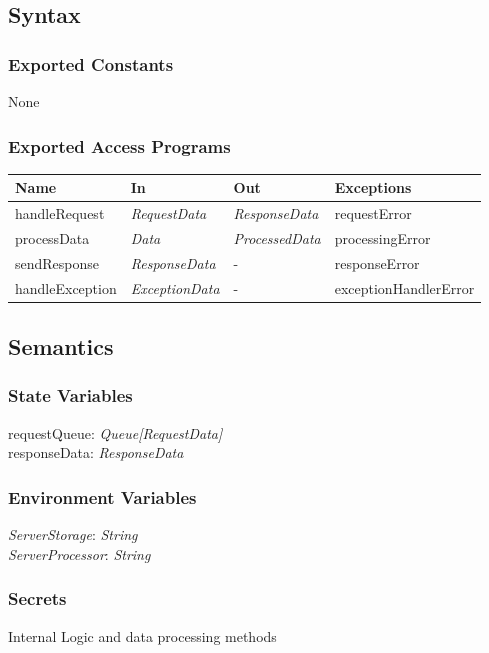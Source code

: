 \documentclass[12pt, titlepage]{article}
\begin{document}
\subsection{Syntax}

\subsubsection{Exported Constants}
None

\subsubsection{Exported Access Programs}

\begin{center}
\begin{tabular}{p{4cm} p{3cm} p{3cm} p{3cm}}
\hline
\textbf{Name} & \textbf{In} & \textbf{Out} & \textbf{Exceptions} \\
\hline
handleRequest & \textit{RequestData} & \textit{ResponseData} & requestError \\
processData & \textit{Data} & \textit{ProcessedData} & processingError \\
sendResponse & \textit{ResponseData} & - & responseError \\
handleException & \textit{ExceptionData} & - & exceptionHandlerError \\
\hline
\end{tabular}
\end{center}

\subsection{Semantics}

\subsubsection{State Variables}

requestQueue: \textit{Queue[RequestData]}\\
responseData: \textit{ResponseData}

\subsubsection{Environment Variables}

\textit{ServerStorage}: \textit{String}\\ \textit{ServerProcessor}: \textit{String}

\subsubsection{Secrets}
Internal Logic and data processing methods
\end{document}
